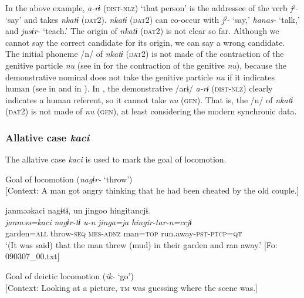 In the above example, \textit{a-rɨ} (\textsc{dist}-\textsc{nlz}) ‘that person’ is the addressee of the verb \textit{jˀ-} ‘say’ and takes \textit{nkatɨ} (\textsc{dat}2). \textit{nkatɨ} (\textsc{dat2}) can co-occur with \textit{jˀ-} ‘say,’ \textit{hanas-} ‘talk,’ and \textit{jusɨr-} ‘teach.’ The origin of \textit{nkatɨ} (\textsc{dat2}) is not clear so far. Although we cannot say the correct candidate for its origin, we can say a wrong candidate. The initial phoneme /n/ of \textit{nkatɨ} (\textsc{dat2}) is not made of the contraction of the genitive particle \textit{nu} (see  in  for the contraction of the genitive \textit{nu}), because the demonstrative nominal does not take the genitive particle \textit{nu} if it indicates human (see  in  and  in ). In , the demonstrative /arɨ/ \textit{a-rɨ} (\textsc{dist}-\textsc{nlz}) clearly indicates a human referent, so it cannot take \textit{nu} (\textsc{gen}). That is, the /n/ of \textit{nkatɨ} (\textsc{dat2}) is not made of \textit{nu} (\textsc{gen}), at least considering the modern synchronic data.

\subsubsection{Allative case \textit{kaci}}

The allative case \textit{kaci} is used to mark the goal of locomotion.

\ea\label{ex:6-59}
\ea Goal of locomotion (\textit{nagɨr-} ‘throw’)\\{}
[Context: A man got angry thinking that he had been cheated by the old couple.]

{\TM}
\glll janməəkaci  nagɨtɨ,  un  jingoo  hingitancjɨ.\\
      \textit{janməə=kaci}  \textit{nagɨr-tɨ}  \textit{u-n}  \textit{jinga=ja}  \textit{hingir-tar-n=ccjɨ}\\
      garden=\textsc{all}  throw-\textsc{seq}  \textsc{mes}-\textsc{adnz}  man=\textsc{top}  run.away-\textsc{pst}-\textsc{ptcp}=\textsc{qt}\\
\glt ‘(It was said) that the man threw (mud) in their garden and ran away.’ [Fo: 090307\_00.txt]
\z

\ex Goal of deictic locomotion (\textit{ik-} ‘go’)\\{}
[Context: Looking at a picture, \textsc{tm} was guessing where the scene was.]

